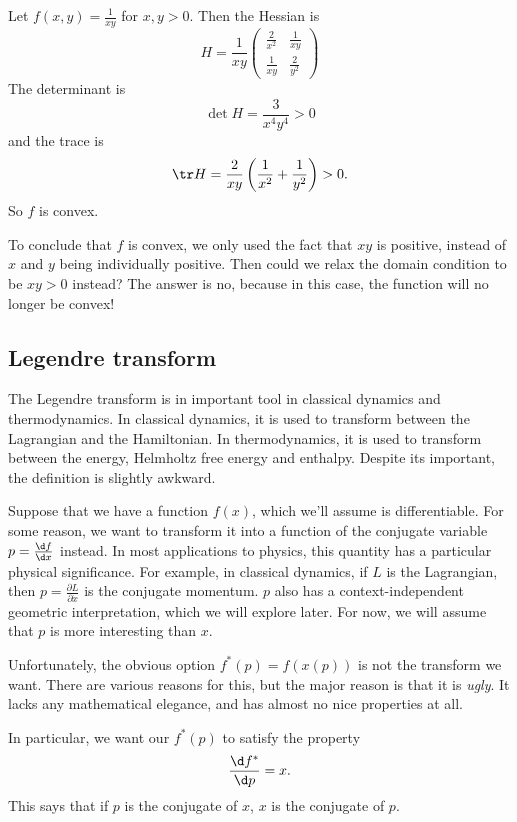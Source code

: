\documentclass[a4paper]{article}
\begin{document}
\begin{eg}
  Let $f(x, y) = \frac{1}{xy}$ for $x, y > 0$. Then the Hessian is
  \[
    H = \frac{1}{xy}
    \begin{pmatrix}
      \frac{2}{x^2} & \frac{1}{xy}\\
      \frac{1}{xy} & \frac{2}{y^2}
    \end{pmatrix}
  \]
  The determinant is
  \[
    \det H = \frac{3}{x^4y^4} > 0
  \]
  and the trace is
  \[
    \tr H = \frac{2}{xy}\left(\frac{1}{x^2} + \frac{1}{y^2}\right) > 0.
  \]
  So $f$ is convex.

  To conclude that $f$ is convex, we only used the fact that $xy$ is positive, instead of $x$ and $y$ being individually positive. Then could we relax the domain condition to be $xy > 0$ instead? The answer is no, because in this case, the function will no longer be convex!
\end{eg}

\subsection{Legendre transform}
The Legendre transform is in important tool in classical dynamics and thermodynamics. In classical dynamics, it is used to transform between the Lagrangian and the Hamiltonian. In thermodynamics, it is used to transform between the energy, Helmholtz free energy and enthalpy. Despite its important, the definition is slightly awkward.

Suppose that we have a function $f(x)$, which we'll assume is differentiable. For some reason, we want to transform it into a function of the conjugate variable $p = \frac{\d f}{\d x}$ instead. In most applications to physics, this quantity has a particular physical significance. For example, in classical dynamics, if $L$ is the Lagrangian, then $p = \frac{\partial L}{\partial \dot{x}}$ is the conjugate momentum. $p$ also has a context-independent geometric interpretation, which we will explore later. For now, we will assume that $p$ is more interesting than $x$.

Unfortunately, the obvious option $f^*(p) = f(x(p))$ is not the transform we want. There are various reasons for this, but the major reason is that it is \emph{ugly}. It lacks any mathematical elegance, and has almost no nice properties at all.

In particular, we want our $f^*(p)$ to satisfy the property
\[
  \frac{\d f^*}{\d p} = x.
\]
This says that if $p$ is the conjugate of $x$, $x$ is the conjugate of $p$.
\end{document}
